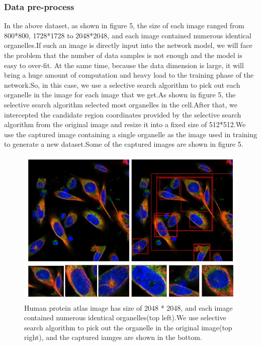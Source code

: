 \documentclass[10pt,twocolumn,letterpaper]{article}
\begin{document}
\subsubsection{Data pre-process}
In the above dataset, as shown in figure 5, the size of each image ranged from 800*800, 1728*1728 to 2048*2048, and each image contained numerous identical organelles.If such an image is directly input into the network model, we will face the problem that the number of data samples is not enough and the model is easy to over-fit. At the same time, because the data dimension is large, it will bring a huge amount of computation and heavy load to the training phase of the network.So, in this case, we use a selective search algorithm to pick out each organelle in the image for each image that we get.As shown in figure 5, the selective search algorithm selected most organelles in the cell.After that, we intercepted the candidate region coordinates provided by the selective search algorithm from the original image and resize it into a fixed size of 512*512.We use the captured image containing a single organelle as the image used in training to generate a new dataset.Some of the captured images are shown in figure 5.

\begin{figure}[t]
\begin{center}
  \includegraphics[width=0.9\linewidth]{figure6.JPG}
\end{center}
  \caption{Human protein atlas image has size of 2048 * 2048, and each image contained numerous identical organelles(top left).We use selective search algorithm to pick out the organelle in the original image(top right), and the captured iamges are shown in the bottom.  }
\label{fig:long}
\label{fig:onecol}
\end{figure}
\end{document}
